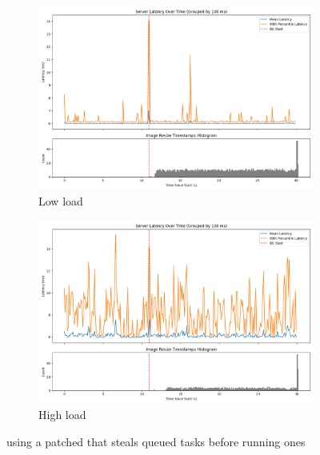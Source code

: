 \subsection{\schedbe}

\begin{figure}[t]
    \centering
    \begin{subfigure}[t]{0.49\columnwidth}
        \includegraphics[width=\columnwidth]{graphs/patched-idle-low-two.png}
        \caption{Low load}\label{fig:patched-idle-low-two}
    \end{subfigure}
    \hspace{\fill}
    \begin{subfigure}[t]{0.49\columnwidth}
        \includegraphics[width=\columnwidth]{graphs/patched-idle-high-two.png}
        \caption{High load}\label{fig:patched-idle-high-two}
    \end{subfigure}
    \vspace{4pt}
    \caption{using a patched \schedidle{} that steals queued \schednormal{}
    tasks before running \schedidle{} ones}\label{fig:patched-idle}
\end{figure}

